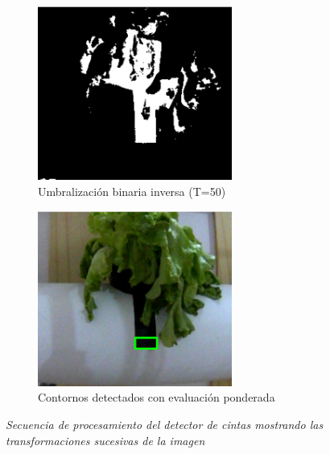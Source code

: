 \begin{figure}[H]
\begin{subfigure}[b]{0.48\textwidth}
    \centering
    \includegraphics[width=0.7\textwidth]{imagenes/detector_marcadores_3_binario.png}
    \caption{Umbralización binaria inversa (T=50)}
\end{subfigure}
\hfill
\begin{subfigure}[b]{0.48\textwidth}
    \centering
    \includegraphics[width=0.7\textwidth]{imagenes/detector_marcadores_4_contornos.png}
    \caption{Contornos detectados con evaluación ponderada}
\end{subfigure}

\caption{\textit{Secuencia de procesamiento del detector de cintas mostrando las transformaciones sucesivas de la imagen}}
\label{fig:proceso_marcadores}
\end{figure}

